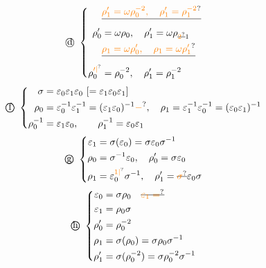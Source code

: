 \[\text{\textcircled{d}}\ \left\{\begin{aligned}
&\deleted{\unsure{\rho'_1=\omega\rho_0^{-2},\quad \rho'_1=\rho_1^{-2}}}\\
\rho'_0&=\omega\rho_0,\quad \rho'_1=\omega\rho_{\deleted{\unsure{2}}1}\\
&\deleted{\unsure{\rho_1=\omega\rho'_0,\quad \rho_1=\omega\rho'_1}}\\
\rho_0^{\unsure{\prime|\vphantom{\prime}}}&=\rho_0^{-2},\quad \rho'_1=\rho_1^{-2}
\end{aligned}\right.\]
\[\text{\textcircled{\textcircled{f}}}\ \left\{\begin{aligned}
\sigma&=\varepsilon_0\varepsilon_1\varepsilon_0\ [=\varepsilon_1\varepsilon_0\varepsilon_1]\\
\rho_0&=\varepsilon_0^{-1}\varepsilon_1^{-1}=(\varepsilon_1\varepsilon_0)^{-1}\unsure{-},\quad \rho_1=\varepsilon_1^{-1}\varepsilon_0^{-1}=(\varepsilon_0\varepsilon_1)^{-1}\\
\rho_0^{-1}&=\varepsilon_1\varepsilon_0,\qquad \rho_1^{-1}=\varepsilon_0\varepsilon_1
\end{aligned}\right.\]
\[\text{\textcircled{\textcircled{g}}}\ \left\{\begin{aligned}
\varepsilon_1&=\sigma(\varepsilon_0)=\sigma \varepsilon_0\sigma^{-1}\\
\rho_0&=\sigma^{-1}\varepsilon_0,\quad \rho'_0=\sigma \varepsilon_0\\
\rho_1&=\varepsilon_0^{\unsure{1|\vphantom{1}}}\sigma^{-1},\quad \rho'_1=\deleted{\unsure{\sigma}}\varepsilon_0\sigma
\end{aligned}\right.\]
\[\text{\textcircled{\textcircled{h}}}\ \left\{\begin{aligned}
\varepsilon_0&=\sigma\rho_0\quad\deleted{\unsure{\varepsilon_1=}}\\
\varepsilon_1&=\rho_0\sigma\\
\rho'_0&=\rho_0^{-2}\\
\rho_1&=\sigma(\rho_0)=\sigma\rho_0\sigma^{-1}\\
\rho'_1&=\sigma(\rho_0^{-2})=\sigma\rho_0^{-2}\sigma^{-1}
\end{aligned}\right.\]
